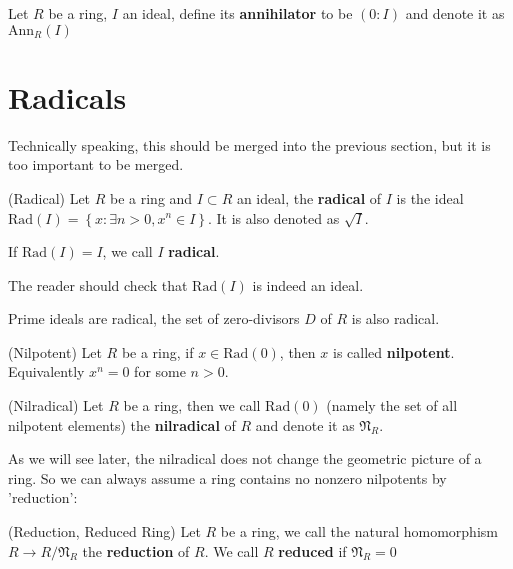 \documentclass{note-eng}
\begin{document}
\begin{definition}
    Let $R$ be a ring, $I$ an ideal, define its \textbf{annihilator} to be $(0: I)$ and denote it as $\mathrm{Ann}_R(I)$
\end{definition}


\iffalse
\section{Radicals}

Technically speaking, this should be merged into the previous section, but it is too important to be merged.

\begin{definition}
    (Radical) Let $R$ be a ring and $I \subset R$ an ideal, the \textbf{radical} of $I$ is the ideal $\mathrm{Rad}(I) = \left\lbrace x: \exists n \gt 0, x^n \in I \right\rbrace$. It is also denoted as $\sqrt{I}$.

    If $\mathrm{Rad}(I) = I$, we call $I$ \textbf{radical}.
\end{definition}

The reader should check that $\mathrm{Rad}(I)$ is indeed an ideal.

\begin{example}
    Prime ideals are radical, the set of zero-divisors $D$ of $R$ is also radical.
\end{example}

\begin{definition}
    (Nilpotent) Let $R$ be a ring, if $x \in \mathrm{Rad}(0)$, then $x$ is called \textbf{nilpotent}. Equivalently $x^n = 0$ for some $n \gt 0$.
\end{definition}

\begin{definition}
    (Nilradical) Let $R$ be a ring, then we call $\mathrm{Rad}(0)$ (namely the set of all nilpotent elements) the \textbf{nilradical} of $R$ and denote it as $\mathfrak{N}_R$.
\end{definition}

As we will see later, the nilradical does not change the geometric picture of a ring. So we can always assume a ring contains no nonzero nilpotents by 'reduction':

\begin{definition}
    (Reduction, Reduced Ring) Let $R$ be a ring, we call the natural homomorphism $R \rightarrow R / \mathfrak{N}_R$ the \textbf{reduction} of $R$. We call $R$ \textbf{reduced} if $\mathfrak{N}_R = 0$
\end{definition}
\end{document}
